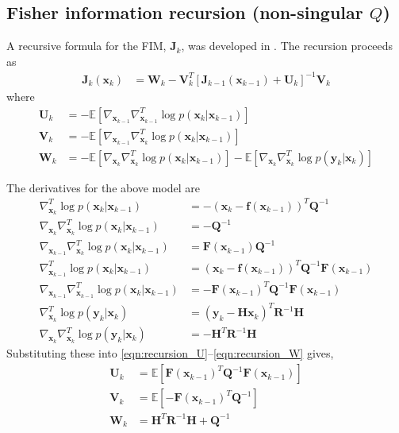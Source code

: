 \documentclass{article}
\renewcommand{\vec}[1]{\ensuremath{{\boldsymbol #1}}}
\newcommand{\mat}[1]{\ensuremath{\boldsymbol{#1}}}
\begin{document}
\subsection{Fisher information recursion (non-singular $Q$)} 
A recursive formula for the FIM, $\mat J_k$, was developed in \cite{Tichavsky1998}. The recursion proceeds as
\begin{align}
	\mat J_k(\vec x_k) &= \mat W_k - \mat V_k^T\left[ \mat J_{k-1}(\vec x_{k-1}) + \mat U_k\right]^{-1}\mat V_k 
\end{align}
where
\begin{align}
	\mat U_k &= -\mathbb E\left[ \nabla_{\vec x_{k-1}}\nabla_{\vec x_{k-1}}^T \log p(\vec x_k|\vec x_{k-1}) \right] \label{eqn:recursion_U}\\
	\mat V_k &= -\mathbb E\left[ \nabla_{\vec x_{k-1}}\nabla_{\vec x_k}^T \log p(\vec x_k|\vec x_{k-1}) \right] \label{eqn:recursion_V}\\
	\mat W_k &= -\mathbb E\left[ \nabla_{\vec x_k}\nabla_{\vec x_k}^T \log p(\vec x_k|\vec x_{k-1}) \right] - \mathbb E\left[ \nabla_{\vec x_k}\nabla_{\vec x_k}^T \log p(\vec y_k|\vec x_k) \right] \label{eqn:recursion_W}
\end{align}

The derivatives for the above model are
\begin{align}
	\nabla_{\vec x_k}^T \log p(\vec x_k|\vec x_{k-1}) &= -(\vec x_k - \vec f(\vec x_{k-1}))^T\mat Q^{-1}  \\
	\nabla_{\vec x_k}\nabla_{\vec x_k}^T \log p(\vec x_k|\vec x_{k-1}) &= -\mat Q^{-1} \\
	\nabla_{\vec x_{k-1}}\nabla_{\vec x_k}^T \log p(\vec x_k|\vec x_{k-1}) &= \mat F(\vec x_{k-1})\mat Q^{-1} \\
	\nabla_{\vec x_{k-1}}^T \log p(\vec x_k|\vec x_{k-1}) &= (\vec x_k - \vec f(\vec x_{k-1}))^T\mat Q^{-1} \mat F(\vec x_{k-1}) \\
	\nabla_{\vec x_{k-1}}\nabla_{\vec x_{k-1}}^T \log p(\vec x_k|\vec x_{k-1}) &= -\mat F(\vec x_{k-1})^T\mat Q^{-1} \mat F(\vec x_{k-1}) \\
	\nabla_{\vec x_k}^T \log p(\vec y_k|\vec x_k) &= (\vec y_k - \mat H\vec x_k)^T\mat R^{-1} \mat H \\
	\nabla_{\vec x_k}\nabla_{\vec x_k}^T \log p(\vec y_k|\vec x_k) &= -\mat H^T\mat R^{-1} \mat H 
\end{align}
Substituting these into \eqref{eqn:recursion_U}--\eqref{eqn:recursion_W} gives,
\begin{align}
	 \mat U_k &= \mathbb E\left[ \mat F(\vec x_{k-1})^T\mat Q^{-1} \mat F(\vec x_{k-1}) \right ] \label{eqn:pcrb_u} \\
	\mat V_k &= \mathbb E\left[ -\mat F(\vec x_{k-1})^T\mat Q^{-1} \right ] \label{eqn:pcrb_v} \\
	\mat W_k &= \mat H^T\mat R^{-1}\mat H + \mat Q^{-1}
\end{align}
\end{document}
